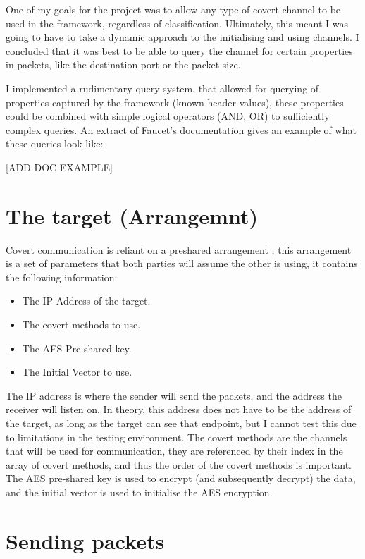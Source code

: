 One of my goals for the project was to allow any type of covert channel to be used in the framework, regardless of classification. Ultimately, this meant I was going to have to take a dynamic approach to the initialising and using channels. I concluded that it was best to be able to query the channel for certain properties in packets, like the destination port or the packet size.

I implemented a rudimentary query system, that allowed for querying of properties captured by the framework (known header values), these properties could be combined with simple logical operators (AND, OR) to sufficiently complex queries. An extract of Faucet's documentation gives an example of what these queries look like:

[ADD DOC EXAMPLE]

\section{The target (Arrangemnt)}
\label{sec:target}

Covert communication is reliant on a preshared arrangement \cite{DoCCaS}, this arrangement is a set of parameters that both parties will assume the other is using, it contains the following information:

\begin{itemize}
    \item The IP Address of the target.
    \item The covert methods to use.
    \item The AES Pre-shared key.
    \item The Initial Vector to use.
\end{itemize}

The IP address is where the sender will send the packets, and the address the receiver will listen on. In theory, this address does not have to be the address of the target, as long as the target can see that endpoint, but I cannot test this due to limitations in the testing environment. The covert methods are the channels that will be used for communication, they are referenced by their index in the array of covert methods, and thus the order of the covert methods is important.
The AES pre-shared key is used to encrypt (and subsequently decrypt) the data, and the initial vector is used to initialise the AES encryption.

\section{Sending packets}
\label{sec:sending_packets}

